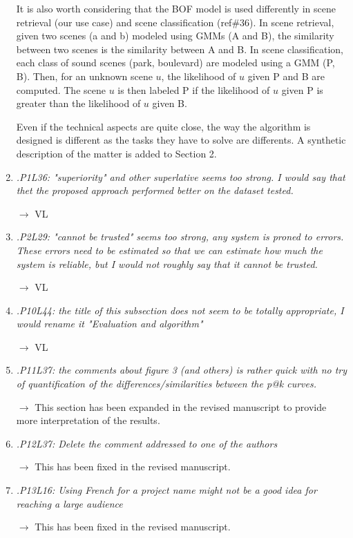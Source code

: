 \documentclass[10pt]{article}
\begin{document}
\begin{enumerate}
It is also worth considering that the BOF model is used differently in scene retrieval (our use case) and scene classification (ref\#36). In scene retrieval, given two scenes (a and b) modeled using GMMs (A and B), the similarity between two scenes is the similarity between A and B. In scene classification, each class of sound scenes (park, boulevard) are modeled using a GMM (P, B). Then, for an unknown scene $u$, the likelihood of $u$ given P and B are computed. The scene $u$ is then labeled P if the likelihood of $u$ given P is greater than the likelihood of $u$ given B.

Even if the technical aspects are quite close, the way the algorithm is designed is different as the tasks they have to solve are differents. A synthetic description of the matter is added to Section 2.

\item \emph{.P1L36: "superiority" and other superlative seems too strong. I would say that thet the proposed approach performed better on the dataset tested.}

$\rightarrow$ VL

\item \emph{.P2L29: "cannot be trusted" seems too strong, any system is proned to errors. These errors need to be estimated so that we can estimate how much the system is reliable, but I would not roughly say that it cannot be trusted.}

$\rightarrow$ VL

\item \emph{.P10L44: the title of this subsection does not seem to be totally appropriate, I would rename it "Evaluation and algorithm"}

$\rightarrow$ VL

\item \emph{.P11L37: the comments about figure 3 (and others) is rather quick with no try of quantification of the differences/similarities between the p@k curves.}

$\rightarrow$
This section has been expanded in the revised manuscript to provide more interpretation of the results.

\item \emph{.P12L37: Delete the comment addressed to one of the authors}

$\rightarrow$
This has been fixed in the revised manuscript.

\item \emph{.P13L16: Using French for a project name might not be a good idea for reaching a large audience}

$\rightarrow$
This has been fixed in the revised manuscript.

\end{enumerate}
\end{document}
